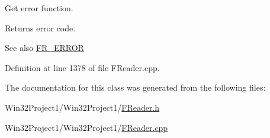 Get error function. 

\begin{DoxyReturn}{Returns}
error code. 
\end{DoxyReturn}
\begin{DoxySeeAlso}{See also}
\hyperlink{_file_structs_8h_ae183556f32e14e06d49b270ca950d90a}{F\+R\+\_\+\+E\+R\+R\+OR} 
\end{DoxySeeAlso}


Definition at line 1378 of file F\+Reader.\+cpp.



The documentation for this class was generated from the following files\+:\begin{DoxyCompactItemize}
\item 
Win32\+Project1/\+Win32\+Project1/\hyperlink{_f_reader_8h}{F\+Reader.\+h}\item 
Win32\+Project1/\+Win32\+Project1/\hyperlink{_f_reader_8cpp}{F\+Reader.\+cpp}\end{DoxyCompactItemize}
